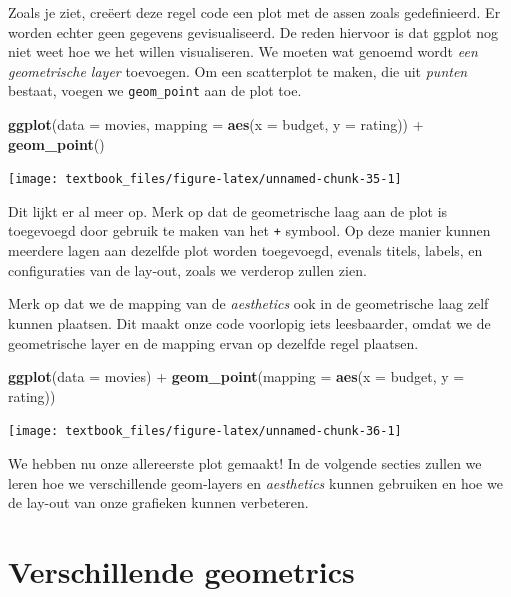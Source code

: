 \documentclass[]{tufte-book}
\newenvironment{Shaded}{}{}
\newcommand{\DataTypeTok}[1]{\textcolor[rgb]{0.56,0.13,0.00}{#1}}
\newcommand{\KeywordTok}[1]{\textcolor[rgb]{0.00,0.44,0.13}{\textbf{#1}}}
\newcommand{\NormalTok}[1]{#1}
\newcommand{\OperatorTok}[1]{\textcolor[rgb]{0.40,0.40,0.40}{#1}}
\newcommand{\StringTok}[1]{\textcolor[rgb]{0.25,0.44,0.63}{#1}}
\begin{document}
Zoals je ziet, creëert deze regel code een plot met de assen zoals gedefinieerd. Er worden echter geen gegevens gevisualiseerd. De reden hiervoor is dat ggplot nog niet weet hoe we het willen visualiseren. We moeten wat genoemd wordt \emph{een geometrische layer} toevoegen. Om een scatterplot te maken, die uit \emph{punten} bestaat, voegen we \texttt{geom\_point} aan de plot toe.

\begin{Shaded}
\begin{Highlighting}[]
\KeywordTok{ggplot}\NormalTok{(}\DataTypeTok{data =}\NormalTok{ movies, }\DataTypeTok{mapping =} \KeywordTok{aes}\NormalTok{(}\DataTypeTok{x =}\NormalTok{ budget, }\DataTypeTok{y =}\NormalTok{ rating)) }\OperatorTok{+}
\StringTok{    }\KeywordTok{geom_point}\NormalTok{()}
\end{Highlighting}
\end{Shaded}

\texttt{[image: textbook\_files/figure-latex/unnamed-chunk-35-1]}

Dit lijkt er al meer op. Merk op dat de geometrische laag aan de plot is toegevoegd door gebruik te maken van het \texttt{+} symbool. Op deze manier kunnen meerdere lagen aan dezelfde plot worden toegevoegd, evenals titels, labels, en configuraties van de lay-out, zoals we verderop zullen zien.

Merk op dat we de mapping van de \emph{aesthetics} ook in de geometrische laag zelf kunnen plaatsen. Dit maakt onze code voorlopig iets leesbaarder, omdat we de geometrische layer en de mapping ervan op dezelfde regel plaatsen.

\begin{Shaded}
\begin{Highlighting}[]
\KeywordTok{ggplot}\NormalTok{(}\DataTypeTok{data =}\NormalTok{ movies) }\OperatorTok{+}
\StringTok{    }\KeywordTok{geom_point}\NormalTok{(}\DataTypeTok{mapping =} \KeywordTok{aes}\NormalTok{(}\DataTypeTok{x =}\NormalTok{ budget, }\DataTypeTok{y =}\NormalTok{ rating))}
\end{Highlighting}
\end{Shaded}

\texttt{[image: textbook\_files/figure-latex/unnamed-chunk-36-1]}

We hebben nu onze allereerste plot gemaakt! In de volgende secties zullen we leren hoe we verschillende geom-layers en \emph{aesthetics} kunnen gebruiken en hoe we de lay-out van onze grafieken kunnen verbeteren.

\hypertarget{verschillende-geometrics}{%
\section{Verschillende geometrics}\label{verschillende-geometrics}}
\end{document}
